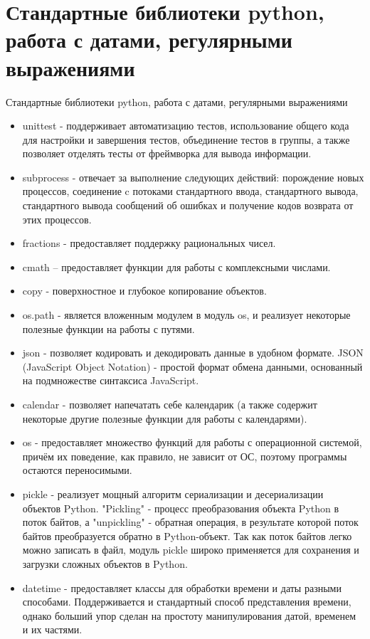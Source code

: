\section{Стандартные библиотеки python, работа с датами, регулярными выражениями}

Стандартные библиотеки python, работа с датами, регулярными выражениями

		\begin{itemize}
	
		\item unittest - поддерживает автоматизацию тестов, использование общего кода для настройки и завершения тестов, объединение тестов в группы, а также позволяет отделять тесты от фреймворка для вывода информации.
		\item subprocess - отвечает за выполнение следующих действий: порождение новых процессов, соединение c потоками стандартного ввода, стандартного вывода, стандартного вывода сообщений об ошибках и получение кодов возврата от этих процессов.
		\item fractions - предоставляет поддержку рациональных чисел.
		\item cmath – предоставляет функции для работы с комплексными числами.
		\item copy - поверхностное и глубокое копирование объектов.
		\item os.path - является вложенным модулем в модуль os, и реализует некоторые полезные функции на работы с путями.
		\item json - позволяет кодировать и декодировать данные в удобном формате. JSON (JavaScript Object Notation) - простой формат обмена данными, основанный на подмножестве синтаксиса JavaScript.
		\item calendar - позволяет напечатать себе календарик (а также содержит некоторые другие полезные функции для работы с календарями).
		\item os - предоставляет множество функций для работы с операционной системой, причём их поведение, как правило, не зависит от ОС, поэтому программы остаются переносимыми.
		\item pickle - реализует мощный алгоритм сериализации и десериализации объектов Python. "Pickling" - процесс преобразования объекта Python в поток байтов, а "unpickling" - обратная операция, в результате которой поток байтов преобразуется обратно в Python-объект. Так как поток байтов легко можно записать в файл, модуль pickle широко применяется для сохранения и загрузки сложных объектов в Python.
		\item datetime - предоставляет классы для обработки времени и даты разными способами. Поддерживается и стандартный способ представления времени, однако больший упор сделан на простоту манипулирования датой, временем и их частями.

\end{itemize}
